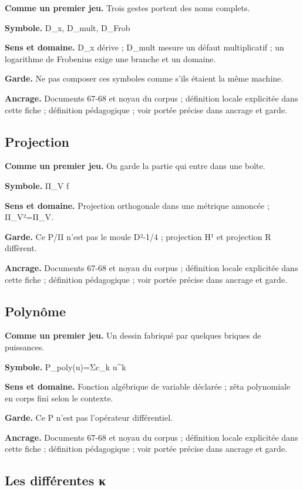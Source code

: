 \documentclass[
  9pt,
  a4paper,
]{article}
\begin{document}
\textbf{Comme un premier jeu.} Trois gestes portent des noms complets.

\textbf{Symbole.} D\_x, D\_mult, D\_Frob

\textbf{Sens et domaine.} D\_x dérive ; D\_mult mesure un défaut
multiplicatif ; un logarithme de Frobenius exige une branche et un
domaine.

\textbf{Garde.} Ne pas composer ces symboles comme s'ils étaient la même
machine.

\textbf{Ancrage.} Documents 67-68 et noyau du corpus ; définition locale
explicitée dans cette fiche ; définition pédagogique ; voir portée
précise dans ancrage et garde.

\hypertarget{projection}{%
\subsection{Projection}\label{projection}}

\textbf{Comme un premier jeu.} On garde la partie qui entre dans une
boîte.

\textbf{Symbole.} Π\_V f

\textbf{Sens et domaine.} Projection orthogonale dans une métrique
annoncée ; Π\_V²=Π\_V.

\textbf{Garde.} Ce P/Π n'est pas le moule D²-1/4 ; projection H¹ et
projection R diffèrent.

\textbf{Ancrage.} Documents 67-68 et noyau du corpus ; définition locale
explicitée dans cette fiche ; définition pédagogique ; voir portée
précise dans ancrage et garde.

\hypertarget{polynuxf4me}{%
\subsection{Polynôme}\label{polynuxf4me}}

\textbf{Comme un premier jeu.} Un dessin fabriqué par quelques briques
de puissances.

\textbf{Symbole.} P\_poly(u)=Σc\_k u\^{}k

\textbf{Sens et domaine.} Fonction algébrique de variable déclarée ;
zêta polynomiale en corps fini selon le contexte.

\textbf{Garde.} Ce P n'est pas l'opérateur différentiel.

\textbf{Ancrage.} Documents 67-68 et noyau du corpus ; définition locale
explicitée dans cette fiche ; définition pédagogique ; voir portée
précise dans ancrage et garde.

\hypertarget{les-diffuxe9rentes-ux3ba}{%
\subsection{Les différentes κ}\label{les-diffuxe9rentes-ux3ba}}
\end{document}
